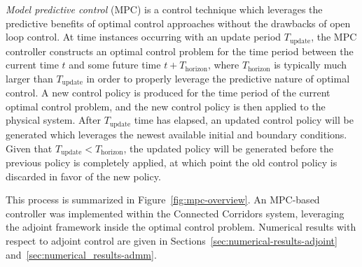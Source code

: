 \emph{Model predictive control} (MPC) is a control technique which leverages the predictive benefits of optimal control approaches without the drawbacks of open loop control. At time instances occurring with an update period $T_{\text{update}}$, the MPC controller constructs an optimal control problem for the time period between the current time $t$ and some future time $t + T_{\text{horizon}}$, where $T_{\text{horizon}}$ is typically much larger than $T_{\text{update}}$ in order to properly leverage the predictive nature of optimal control. A new control policy is produced for the time period of the current optimal control problem, and the new control policy is then applied to the physical system. After $T_\text{update}$ time has elapsed, an updated control policy will be generated which leverages the newest available initial and boundary conditions. Given that $T_\text{update} < T_\text{horizon}$, the updated policy will be generated before the previous policy is completely applied, at which point the old control policy is discarded in favor of the new policy.


This process is summarized in Figure~\ref{fig:mpc-overview}. An MPC-based controller was implemented within the Connected Corridors system, leveraging the adjoint framework inside the optimal control problem. Numerical results with respect to adjoint control are given in Sections~\ref{sec:numerical-results-adjoint} and~\ref{sec:numerical_results-admm}.
